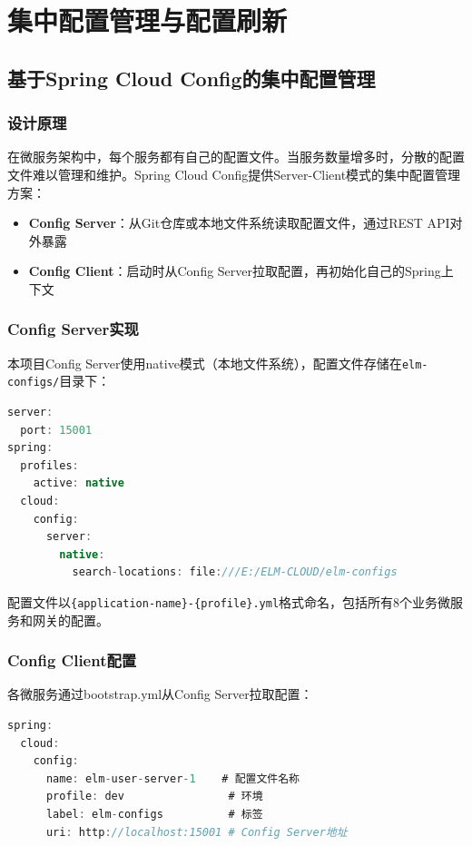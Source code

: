 
\chapter{集中配置管理与配置刷新}

\section{基于Spring Cloud Config的集中配置管理}

\subsection{设计原理}

在微服务架构中，每个服务都有自己的配置文件。当服务数量增多时，分散的配置文件难以管理和维护。Spring Cloud Config提供Server-Client模式的集中配置管理方案：

\begin{itemize}
	\item \textbf{Config Server}：从Git仓库或本地文件系统读取配置文件，通过REST API对外暴露
	\item \textbf{Config Client}：启动时从Config Server拉取配置，再初始化自己的Spring上下文
\end{itemize}

\subsection{Config Server实现}

本项目Config Server使用native模式（本地文件系统），配置文件存储在\verb|elm-configs/|目录下：

\begin{lstlisting}[language=Java, caption=Config Server配置]
server:
  port: 15001
spring:
  profiles:
    active: native
  cloud:
    config:
      server:
        native:
          search-locations: file:///E:/ELM-CLOUD/elm-configs
\end{lstlisting}

配置文件以\verb|{application-name}-{profile}.yml|格式命名，包括所有8个业务微服务和网关的配置。

\subsection{Config Client配置}

各微服务通过bootstrap.yml从Config Server拉取配置：

\begin{lstlisting}[language=Java, caption=Config Client bootstrap.yml]
spring:
  cloud:
    config:
      name: elm-user-server-1    # 配置文件名称
      profile: dev                # 环境
      label: elm-configs          # 标签
      uri: http://localhost:15001 # Config Server地址
\end{lstlisting}

